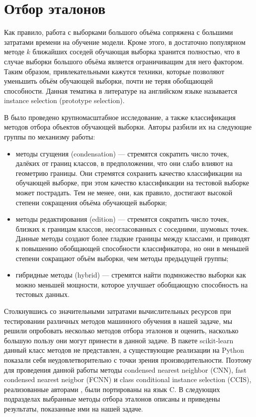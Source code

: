 \section{Отбор эталонов}
Как правило, работа с выборками большого объёма сопряжена с большими затратами времени на обучение модели. Кроме этого, в достаточно популярном методе \(k\) ближайших соседей обучающая выборка хранится полностью, что в случае выборки большого объёма является ограничиващим для него фактором. Таким образом, привлекательными кажутся техники, которые позволяют уменьшить объём обучающей выборки, почти не теряя обобщающей способности. Данная тематика в литературе на английском языке называется instance selection (prototype selection).

В \cite{ps-taxonomy} было проведено крупномасштабное исследование, а также классификация методов отбора объектов обучающей выборки. Авторы разбили их на следующие группы по механизму работы:
\begin{itemize}
    \item методы сгущения (condensation) --- стремятся сократить число точек, далёких от границ классов, в предположении, что они слабо влияют на геометрию границы. Они стремятся сохранить качество классификации на обучающей выборке, при этом качество классификации на тестовой выборке может пострадать. Тем не менее, они, как правило, достигают высокой степени сокращения объёма обучающей выборки;
    \item методы редактирования (edition) --- стремятся сократить число точек, близких к границам классов, несогласованных с соседними, шумовых точек. Данные методы создают более гладкие границы между классами, и приводят к повышению обобщающей способности классификатора, но они в меньшей степени сокращают объём выборки, чем методы предыдущей группы;
    \item гибридные методы (hybrid) --- стремятся найти подмножество выборки как можно меньшей мощности, которое улучшает обобщающую способность на тестовых данных.
\end{itemize}

Столкнувшись со значительными затратами вычислительных ресурсов при тестировании различных методов машинного обучения в нашей задаче, мы решили опробовать несколько методов отбора эталонов и оценить, насколько большую пользу они могут принести в данной задаче. В пакете scikit-learn данный класс методов не представлен, а существующие реализации на Python \cite{scikit-protopy} показали себя неудовлетворительно с точки зрения производительности. Поэтому для проведения данной работы методы condensed nearest neighbor (CNN), fast condensed nearest neigbor (FCNN) и class conditional instance selection (CCIS), реализованные авторами \cite{ps-taxonomy}, были портированы на язык C. В следующих подразделах выбранные методы отбора эталонов описаны и приведены результаты, показанные ими на нашей задаче.

